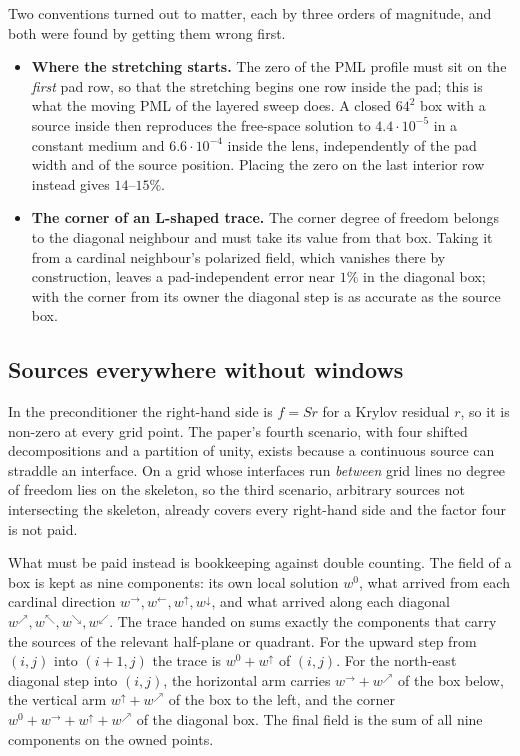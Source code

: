 \documentclass[11pt]{article}
\begin{document}
Two conventions turned out to matter, each by three orders of magnitude, and both were
found by getting them wrong first.
\begin{itemize}
\item \textbf{Where the stretching starts.} The zero of the PML profile must sit on the
\emph{first} pad row, so that the stretching begins one row inside the pad; this is what
the moving PML of the layered sweep does. A closed $64^2$ box with a source inside then
reproduces the free-space solution to $4.4\cdot10^{-5}$ in a constant medium and
$6.6\cdot10^{-4}$ inside the lens, independently of the pad width and of the source
position. Placing the zero on the last interior row instead gives $14$--$15\%$.
\item \textbf{The corner of an L-shaped trace.} The corner degree of freedom belongs to
the diagonal neighbour and must take its value from that box. Taking it from a cardinal
neighbour's polarized field, which vanishes there by construction, leaves a
pad-independent error near $1\%$ in the diagonal box; with the corner from its owner the
diagonal step is as accurate as the source box.
\end{itemize}

\subsection{Sources everywhere without windows}

In the preconditioner the right-hand side is $f=Sr$ for a Krylov residual $r$, so it is
non-zero at every grid point. The paper's fourth scenario, with four shifted
decompositions and a partition of unity, exists because a continuous source can straddle
an interface. On a grid whose interfaces run \emph{between} grid lines no degree of freedom
lies on the skeleton, so the third scenario, arbitrary sources not intersecting the
skeleton, already covers every right-hand side and the factor four is not paid.

What must be paid instead is bookkeeping against double counting. The field of a box is
kept as nine components: its own local solution $w^{0}$, what arrived from each cardinal
direction $w^{\rightarrow},w^{\leftarrow},w^{\uparrow},w^{\downarrow}$, and what arrived
along each diagonal $w^{\nearrow},w^{\nwarrow},w^{\searrow},w^{\swarrow}$. The trace
handed on sums exactly the components that carry the sources of the relevant half-plane or
quadrant. For the upward step from $(i,j)$ into $(i{+}1,j)$ the trace is $w^0+w^\uparrow$
of $(i,j)$. For the north-east diagonal step into $(i,j)$, the horizontal arm carries
$w^\rightarrow+w^\nearrow$ of the box below, the vertical arm $w^\uparrow+w^\nearrow$ of
the box to the left, and the corner $w^0+w^\rightarrow+w^\uparrow+w^\nearrow$ of the
diagonal box. The final field is the sum of all nine components on the owned points.
\end{document}
